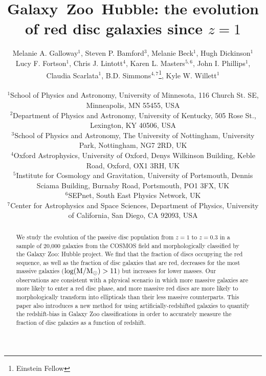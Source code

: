 \documentclass[useAMS,usenatbib]{mn2e}
\begin{document}
\title[Galaxy~Zoo~Hubble: passive red discs]{Galaxy~Zoo~Hubble: the evolution of red disc galaxies since $z=1$}
\author[Galloway et~al.]{\parbox[t]{16cm}{Melanie A. Galloway$^{1}$, Steven P. Bamford$^{3}$, Melanie Beck$^{1}$,
Hugh Dickinson$^{1}$ Lucy F. Fortson$^{1}$, Chris J. Lintott$^{4}$, Karen L. Masters$^{5,6}$, John I. Phillips$^{1}$, Claudia Scarlata$^{1}$,
B.D. Simmons$^{4,7}$\footnote{Einstein Fellow}, Kyle W. Willett$^{1}$
\vspace{0.1in} }\\
$^{1}$School of Physics and Astronomy, University of Minnesota, 116 Church St. SE, Minneapolis, MN 55455, USA \\
$^{2}$Department of Physics and Astronomy, University of Kentucky, 505 Rose St., Lexington, KY 40506, USA \\
$^{3}$School of Physics and Astronomy, The University of Nottingham, University Park, Nottingham, NG7 2RD, UK \\
$^{4}$Oxford Astrophysics, University of Oxford, Denys Wilkinson Building, Keble Road, Oxford, OX1 3RH, UK \\
$^{5}$Institute for Cosmology and Gravitation, University of Portsmouth, Dennis Sciama Building, Burnaby Road, Portsmouth, PO1 3FX, UK \\
$^{6}$SEPnet, South East Physics Network, UK \\
$^{7}$Center for Astrophysics and Space Sciences, Department of Physics, University of California, San Diego, CA 92093, USA \\
   }
\maketitle

\begin{abstract}
We study the evolution of the passive disc population from $z=1$ to $z=0.3$ in a sample of 20,000 galaxies from the COSMOS field and morphologically classified by the Galaxy Zoo: Hubble project. We find that the fraction of discs occupying the red sequence, as well as the fraction of disc galaxies that are red, decreases for the most massive galaxies ($\rm log(M/M_{\odot})>11$) but increases for lower masses. Our observations are consistent with a physical scenario in which more massive galaxies are more likely to enter a red disc phase, and more massive red discs are more likely to morphologically transform into ellipticals than their less massive counterparts. This paper also introduces a new method for using artificially-redshifted galaxies to quantify the redshift-bias in Galaxy Zoo classifications in order to accurately measure the fraction of disc galaxies as a function of redshift.  


\end{abstract}
\end{document}
